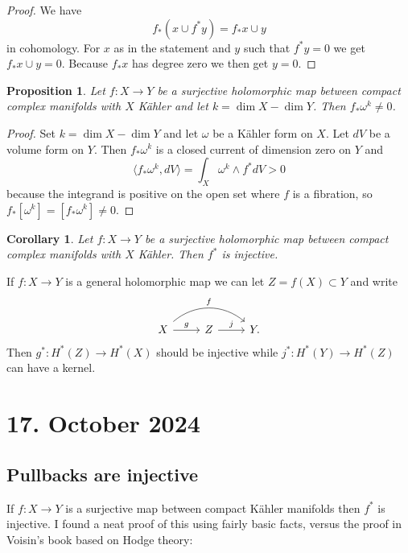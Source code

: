 \documentclass[11pt]{amsart}
\newtheorem{prop}[theo]{Proposition}
\newtheorem{coro}[theo]{Corollary}
\theoremstyle{definition}
\def\<{\langle}
\def\>{\rangle}
\begin{document}
\begin{proof}
We have
\[
f_*(x \cup f^*y) = f_*x \cup y
\]
in cohomology.
For $x$ as in the statement and $y$ such that $f^*y = 0$ we get $f_* x \cup y = 0$.
Because $f_* x$ has degree zero we then get $y = 0$.
\end{proof}


\begin{prop}
\label{prop:kahler-pushforward-nonzero}
Let $f : X \to Y$ be a surjective holomorphic map between compact complex manifolds with $X$ K\"ahler and let $k = \dim X - \dim Y$.
Then $f_*\omega^{k} \not= 0$.
\end{prop}

\begin{proof}
Set $k = \dim X - \dim Y$ and let $\omega$ be a K\"ahler form on $X$.
Let $dV$ be a volume form on $Y$.
Then $f_* \omega^k$ is a closed current of dimension zero on $Y$ and
\[
\< f_* \omega^k, dV \>
= \int_X \omega^k \wedge f^*dV > 0
\]
because the integrand is positive on the open set where $f$ is a fibration,
so $f_* [\omega^k] = [f_*\omega^k] \not= 0$.
\end{proof}


\begin{coro}
Let $f : X \to Y$ be a surjective holomorphic map between compact complex manifolds with $X$ K\"ahler.
Then $f^*$ is injective.
\end{coro}


If $f : X \to Y$ is a general holomorphic map we can let $Z = f(X) \subset Y$ and write
\[
\begin{tikzcd}
X \ar[r,"g"] \ar[rr,bend right=-40,"f"] &
Z \ar[r,"j"] &
Y.
\end{tikzcd}
\]
Then $g^* : H^*(Z) \to H^*(X)$ should be injective while $j^*: H^*(Y) \to H^*(Z)$ can have a kernel.




\section{17. October 2024}

\subsection*{Pullbacks are injective}

If $f : X \to Y$ is a surjective map between compact K\"ahler manifolds then $f^*$ is injective.
I found a neat proof of this using fairly basic facts, versus the proof in Voisin's book based on Hodge theory:
\end{document}
